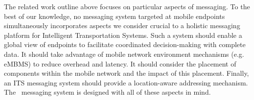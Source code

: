The related work outline above focuses on particular aspects of
messaging.  To the best of our knowledge, no messaging system targeted
at mobile endpoints simultaneously incorporates aspects we consider
crucial to a holistic messaging platform for Intelligent
Transportation Systems.  Such a system should enable a global view of
endpoints to facilitate coordinated decision-making with complete
data. It should take advantage of mobile network environment
mechanisms (e.g. eMBMS) to reduce overhead and latency. It should
consider the placement of components within the mobile network and the
impact of this placement.  Finally, an ITS messaging system should
provide a location-aware addressing mechanism. The \name~messaging
system is designed with all of these aspects in mind.
